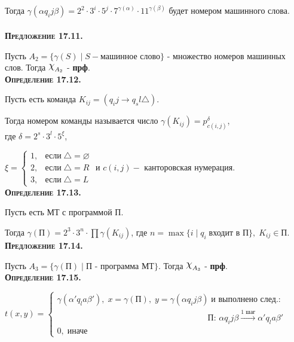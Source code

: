 \documentclass[18pt, a4paper]{extarticle}
\newcommand{\al}{\alpha}
\begin{document}
Тогда $\gamma(\al q_i j\beta)=2^2\cdot3^i\cdot5^j\cdot7^{\gamma(\al)}\cdot11^{\gamma(\beta)}$ будет номером машинного слова.\\\\

\textbf{\textsc{Предложение 17.11.}} 

Пусть $A_2=\{\gamma(S)\;|\;S-\text{машинное слово}\}$ -  множество номеров машинных слов. Тогда $\raisebox{.5ex}{\scalebox{1.2}{$\chi$}}_{A_2}$ -  \textbf{прф}.\\

\textbf{\textsc{Определение 17.12.}}

Пусть есть команда $K_{ij}=(q_ij\to q_sl\triangle)$.

Тогда номером команды называется число $\gamma(K_{ij})=p_{c(i,j)}^\delta$,\\ где $\delta=2^s\cdot3^l\cdot5^\xi$, 

$\xi=
\begin{cases}
   1, &\text{если}\;\triangle=\varnothing\\
   2, &\text{если}\;\triangle=R\\
   3, &\text{если}\;\triangle=L
\end{cases}$ \qquad
и $c(i,j)-$ канторовская нумерация.\\

\textbf{\textsc{Определение 17.13.}} 

Пусть есть МТ с программой П. 

Тогда $\gamma(\text{П})=2^3\cdot3^n\cdot	\prod\gamma(K_{ij})$, где $n=\max\{i\;|\;q_i\;\text{входит в П}\},\;K_{ij}\in\text{П}$.\\

\textbf{\textsc{Предложение 17.14.}} 

Пусть $A_3=\{\gamma(\text{П})\;|\;\text{П - программа МТ}\}$. Тогда $\raisebox{.5ex}{\scalebox{1.2}{$\chi$}}_{A_3}$ -  \textbf{прф}.\\

\textbf{\textsc{Определение 17.15.}}

$t(x,y)=\begin{cases}
   \gamma(\al'q_l a\beta'),\;x=\gamma(\text{П}),\;y=\gamma(\al q_i j\beta)\;\text{и выполнено след.:}\\\qquad\qquad\qquad\qquad\qquad\qquad\qquad\qquad\qquad \text{П: }\al q_i j\beta\xrightarrow{\text{1 шаг}}\al' q_l a\beta'\\
   0,\;\text{иначе}
\end{cases}$\\
\end{document}
